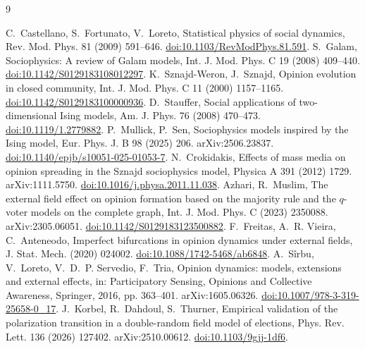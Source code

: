 \begin{thebibliography}{9}
 C.~Castellano, S.~Fortunato, V.~Loreto, Statistical physics of social dynamics, Rev. Mod. Phys. 81 (2009) 591--646. \href{https://doi.org/10.1103/RevModPhys.81.591}{doi:10.1103/RevModPhys.81.591}.
 S.~Galam, Sociophysics: A review of Galam models, Int. J. Mod. Phys. C 19 (2008) 409--440. \href{https://doi.org/10.1142/S0129183108012297}{doi:10.1142/S0129183108012297}.
 K.~Sznajd-Weron, J.~Sznajd, Opinion evolution in closed community, Int. J. Mod. Phys. C 11 (2000) 1157--1165. \href{https://doi.org/10.1142/S0129183100000936}{doi:10.1142/S0129183100000936}.
 D.~Stauffer, Social applications of two-dimensional Ising models, Am. J. Phys. 76 (2008) 470--473. \href{https://doi.org/10.1119/1.2779882}{doi:10.1119/1.2779882}.
 P.~Mullick, P.~Sen, Sociophysics models inspired by the Ising model, Eur. Phys. J. B 98 (2025) 206. arXiv:2506.23837. \href{https://doi.org/10.1140/epjb/s10051-025-01053-7}{doi:10.1140/epjb/s10051-025-01053-7}.
 N.~Crokidakis, Effects of mass media on opinion spreading in the Sznajd sociophysics model, Physica A 391 (2012) 1729. arXiv:1111.5750. \href{https://doi.org/10.1016/j.physa.2011.11.038}{doi:10.1016/j.physa.2011.11.038}.
 Azhari, R.~Muslim, The external field effect on opinion formation based on the majority rule and the $q$-voter models on the complete graph, Int. J. Mod. Phys. C (2023) 2350088. arXiv:2305.06051. \href{https://doi.org/10.1142/S0129183123500882}{doi:10.1142/S0129183123500882}.
 F.~Freitas, A.~R. Vieira, C.~Anteneodo, Imperfect bifurcations in opinion dynamics under external fields, J. Stat. Mech. (2020) 024002. \href{https://doi.org/10.1088/1742-5468/ab6848}{doi:10.1088/1742-5468/ab6848}.
 A.~S\^{i}rbu, V.~Loreto, V.~D.~P. Servedio, F.~Tria, Opinion dynamics: models, extensions and external effects, in: Participatory Sensing, Opinions and Collective Awareness, Springer, 2016, pp. 363--401. arXiv:1605.06326. \href{https://doi.org/10.1007/978-3-319-25658-0_17}{doi:10.1007/978-3-319-25658-0\_17}.
 J.~Korbel, R.~Dahdoul, S.~Thurner, Empirical validation of the polarization transition in a double-random field model of elections, Phys. Rev. Lett. 136 (2026) 127402. arXiv:2510.00612. \href{https://doi.org/10.1103/9gjj-1df6}{doi:10.1103/9gjj-1df6}.

\end{thebibliography}
